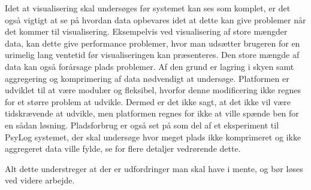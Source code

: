Idet at visualisering skal undersøges før systemet kan ses som komplet, er det også vigtigt at se på hvordan data opbevares idet at dette kan give problemer når det kommer til visualisering. 
Eksempelvis ved visualisering af store mængder data, kan dette give performance problemer, hvor man udsætter brugeren for en urimelig lang ventetid før visualiseringen kan præsenteres. 
Den store mængde af data kan også forårsage plads problemer. 
Af den grund er lagring i skyen samt aggregering og komprimering af data nødvendigt at undersøge.
Platformen er udviklet til at være modulær og fleksibel, hvorfor denne modificering ikke regnes for et større problem at udvikle.
Dermed er det ikke sagt, at det ikke vil være tidskrævende at udvikle, men platformen regnes for ikke at ville spænde ben for en sådan løsning.
Pladsforbrug er også set på som del af et eksperiment til PsyLog systemet, der skal undersøge hvor meget plads ikke komprimeret og ikke aggregeret data ville fylde, se \citet[Kapitel 4, Sektion 6]{misc:faellesrapp}  for flere detaljer vedrørende dette.

Alt dette understreger at der er udfordringer man skal have i mente, og bør løses ved videre arbejde.